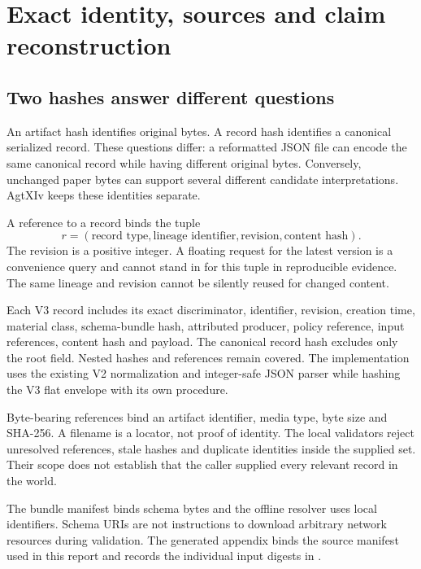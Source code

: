 \section{Exact identity, sources and claim reconstruction}\label{sec:source}

\subsection{Two hashes answer different questions}

An artifact hash identifies original bytes. A record hash identifies a canonical serialized record. These questions differ: a reformatted JSON file can encode the same canonical record while having different original bytes. Conversely, unchanged paper bytes can support several different candidate interpretations. AgtXIv keeps these identities separate.

 A reference to a record binds the tuple
\begin{equation}
  r=(\text{record type},\text{lineage identifier},\text{revision},\text{content hash}).
\end{equation}
The revision is a positive integer. A floating request for the latest version is a convenience query and cannot stand in for this tuple in reproducible evidence. The same lineage and revision cannot be silently reused for changed content.

 Each V3 record includes its exact discriminator, identifier, revision, creation time, material class, schema-bundle hash, attributed producer, policy reference, input references, content hash and payload. The canonical record hash excludes only the root  field. Nested hashes and references remain covered. The implementation uses the existing V2 normalization and integer-safe JSON parser while hashing the V3 flat envelope with its own procedure.

 Byte-bearing references bind an artifact identifier, media type, byte size and SHA-256. A filename is a locator, not proof of identity. The local validators reject unresolved references, stale hashes and duplicate identities inside the supplied set. Their scope does not establish that the caller supplied every relevant record in the world.

The bundle manifest binds schema bytes and the offline resolver uses local identifiers. Schema URIs are not instructions to download arbitrary network resources during validation. The generated appendix binds the source manifest used in this report and records the individual input digests in .

